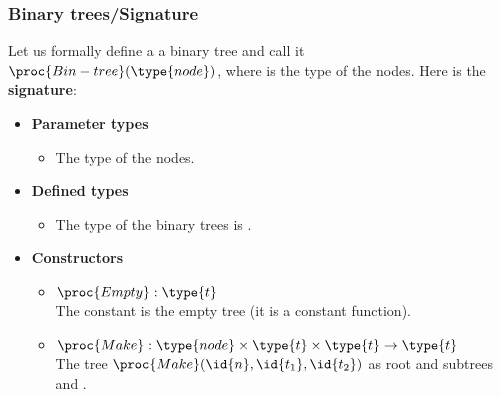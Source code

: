 %
\begin{frame}
\frametitle{Binary trees/Signature}

Let us formally define a a binary tree and call it \(\proc{Bin-tree}
(\type{node})\), where  is the type of the nodes. Here is
the \textbf{signature}:
\begin{itemize}

  \item \textbf{Parameter types}

  \begin{itemize}
 
     \item The type  of the nodes.

  \end{itemize}

  \item \textbf{Defined types}

    \begin{itemize}

      \item The type of the binary trees is .
    
  \end{itemize}

  \item \textbf{Constructors}

   \begin{itemize}

     \item \(\proc{Empty} : \type{t}\)\\ The constant  is
       the empty tree (it is a constant function).

     \item \(\proc{Make} : \type{node} \times \type{t} \times \type{t}
       \rightarrow \type{t}\)\\ The tree \(\proc{Make} (\id{n},
       \id{t_1}, \id{t_2})\) as root  and
       subtrees  and .

   \end{itemize}

\end{itemize}

\end{frame}

